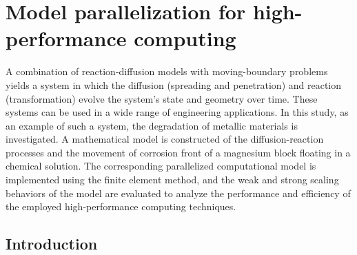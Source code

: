 \chapter{Model parallelization for high-performance computing}\label{ch:hpc}

\noindent{}
\bigskip



A combination of reaction-diffusion models with moving-boundary problems yields a system in which the diffusion (spreading and penetration) and reaction (transformation) evolve the system's state and geometry over time. These systems can be used in a wide range of engineering applications. In this study, as an example of such a system, the degradation of metallic materials is investigated. A mathematical model is constructed of the diffusion-reaction processes and the movement of corrosion front of a magnesium block floating in a chemical solution. The corresponding parallelized computational model is implemented using the finite element method, and the weak and strong scaling behaviors of the model are evaluated to analyze the performance and efficiency of the employed high-performance computing techniques.

\section{Introduction}

